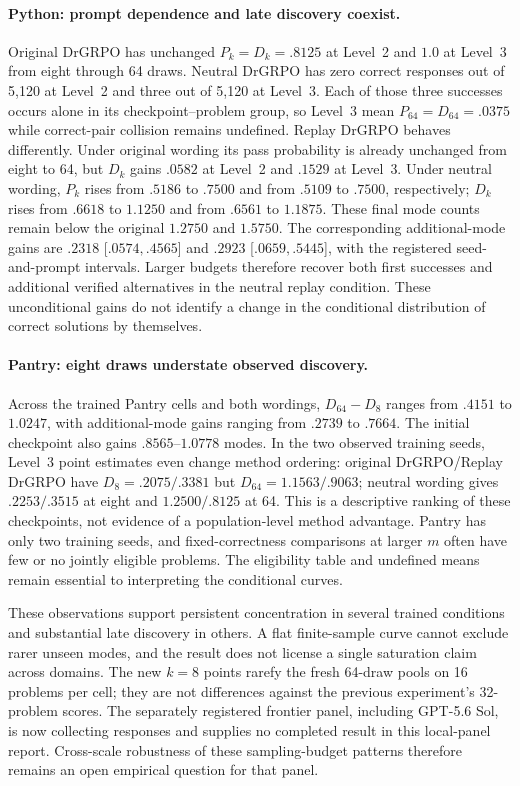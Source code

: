 \documentclass{article}
\newcommand{\1}{\mathbf 1}
\theoremstyle{remark}
\theoremstyle{definition}
\theoremstyle{plain}
\begin{document}
\paragraph{Python: prompt dependence and late discovery coexist.}
Original DrGRPO has unchanged $P_k=D_k=.8125$ at Level~2 and $1.0$ at
Level~3 from eight through 64 draws. Neutral DrGRPO has zero correct responses
out of 5,120 at Level~2 and three out of 5,120 at Level~3. Each of those
three successes occurs alone in its checkpoint--problem group, so Level~3
mean $P_{64}=D_{64}=.0375$ while correct-pair collision remains undefined.
Replay DrGRPO behaves differently. Under original wording its pass probability
is already unchanged from eight to 64, but $D_k$ gains $.0582$ at Level~2
and $.1529$ at Level~3. Under neutral wording, $P_k$ rises from $.5186$ to
$.7500$ and from $.5109$ to $.7500$, respectively; $D_k$ rises from $.6618$
to $1.1250$ and from $.6561$ to $1.1875$. These final mode counts remain
below the original $1.2750$ and $1.5750$. The corresponding additional-mode
gains are $.2318$ [$.0574,.4565$] and $.2923$ [$.0659,.5445$], with the
registered seed-and-prompt intervals. Larger budgets therefore recover both
first successes and additional verified alternatives in the neutral replay
condition. These unconditional gains do not identify a change in the
conditional distribution of correct solutions by themselves.

\paragraph{Pantry: eight draws understate observed discovery.}
Across the trained Pantry cells and both wordings, $D_{64}-D_8$ ranges
from $.4151$ to $1.0247$, with additional-mode gains ranging from $.2739$
to $.7664$. The initial checkpoint also gains $.8565$--$1.0778$ modes.
In the two observed training seeds, Level~3 point estimates even change
method ordering: original DrGRPO/Replay DrGRPO have $D_8=.2075/.3381$
but $D_{64}=1.1563/.9063$; neutral wording gives $.2253/.3515$ at eight
and $1.2500/.8125$ at 64. This is a descriptive ranking of these checkpoints,
not evidence of a population-level method advantage. Pantry has only two
training seeds, and fixed-correctness comparisons at larger $m$ often have
few or no jointly eligible problems. The eligibility table and undefined
means remain essential to interpreting the conditional curves.

These observations support persistent concentration in several trained
conditions and substantial late discovery in others. A flat finite-sample
curve cannot exclude rarer unseen modes, and the result does not license a
single saturation claim across domains. The new $k=8$ points rarefy the fresh
64-draw pools on 16 problems per cell; they are not differences against the
previous experiment's 32-problem scores. The separately registered frontier
panel, including GPT-5.6 Sol, is now collecting responses and supplies
no completed result in this local-panel report. Cross-scale robustness of these sampling-budget
patterns therefore remains an open empirical question for that panel.
\end{document}
